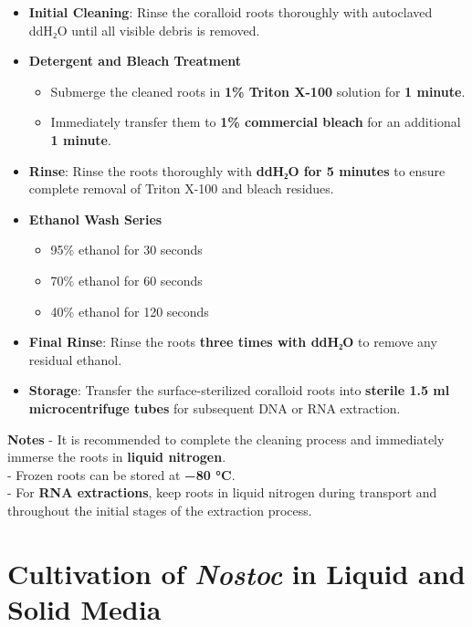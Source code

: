 \documentclass[
  11pt,
]{article}
\providecommand{\tightlist}{%
  \setlength{\itemsep}{0pt}\setlength{\parskip}{0pt}}
\begin{document}
\begin{itemize}
\item
  \textbf{Initial Cleaning}: Rinse the coralloid roots thoroughly with
  autoclaved ddH₂O until all visible debris is removed.
\item
  \textbf{Detergent and Bleach Treatment}

  \begin{itemize}
  \tightlist
  \item
    Submerge the cleaned roots in \textbf{1\% Triton X-100} solution for
    \textbf{1 minute}.\\
  \item
    Immediately transfer them to \textbf{1\% commercial bleach} for an
    additional \textbf{1 minute}.
  \end{itemize}
\item
  \textbf{Rinse}: Rinse the roots thoroughly with \textbf{ddH₂O for 5
  minutes} to ensure complete removal of Triton X-100 and bleach
  residues.
\item
  \textbf{Ethanol Wash Series}

  \begin{itemize}
  \tightlist
  \item
    95\% ethanol for 30 seconds\\
  \item
    70\% ethanol for 60 seconds\\
  \item
    40\% ethanol for 120 seconds
  \end{itemize}
\item
  \textbf{Final Rinse}: Rinse the roots \textbf{three times with ddH₂O}
  to remove any residual ethanol.
\item
  \textbf{Storage}: Transfer the surface-sterilized coralloid roots into
  \textbf{sterile 1.5 ml microcentrifuge tubes} for subsequent DNA or
  RNA extraction.
\end{itemize}

\textbf{Notes} - It is recommended to complete the cleaning process and
immediately immerse the roots in \textbf{liquid nitrogen}.\\
- Frozen roots can be stored at \textbf{−80 °C}.\\
- For \textbf{RNA extractions}, keep roots in liquid nitrogen during
transport and throughout the initial stages of the extraction process.

\section{\texorpdfstring{Cultivation of \emph{Nostoc} in Liquid and
Solid
Media}{Cultivation of Nostoc in Liquid and Solid Media}}\label{cultivation-of-nostoc-in-liquid-and-solid-media}
\end{document}
